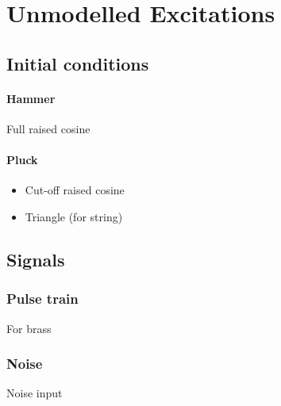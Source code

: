 \chapter{Unmodelled Excitations}

\section{Initial conditions}

\subsubsection{Hammer}
Full raised cosine

\subsubsection{Pluck}
\begin{itemize}
    \item Cut-off raised cosine
    \item Triangle (for string)
\end{itemize}


\section{Signals}
\subsection{Pulse train}
For brass

\subsection{Noise}
Noise input
